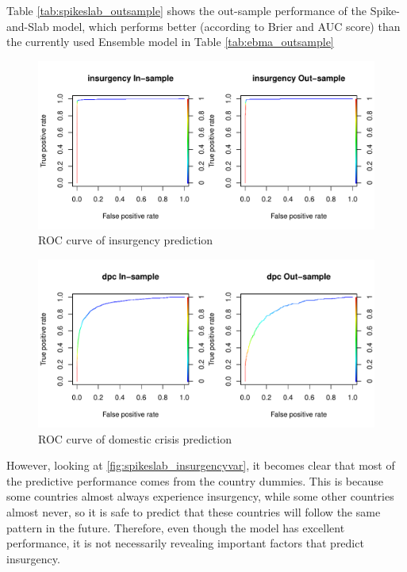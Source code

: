 \documentclass{article}
\begin{document}
\begin{table}[H]
\centering
{}
\caption{Table \autoref{tab:spikeslab_outsample} shows the out-sample performance of the Spike-and-Slab model, which performs better (according to Brier and AUC score) than the currently used Ensemble model in Table \autoref{tab:ebma_outsample}}
\end{table}

\begin{figure}[H]
\includegraphics[width=\textwidth]{fig/spikeslab_roc_insurgency}
\caption{ROC curve of insurgency prediction}
\label{fig:spikeslab_roc_insurgency}
\end{figure}

\begin{figure}[H]
\includegraphics[width=\textwidth]{fig/spikeslab_roc_dpc}
\caption{ROC curve of domestic crisis prediction}
\label{fig:spikeslab_roc_dpc}
\end{figure}

However, looking at \autoref{fig:spikeslab_insurgencyvar}, it becomes clear that most of the predictive performance comes from the country dummies. This is because some countries almost always experience insurgency, while some other countries almost never, so it is safe to predict that these countries will follow the same pattern in the future. Therefore, even though the model has excellent performance, it is not necessarily revealing important factors that predict insurgency.
\end{document}
